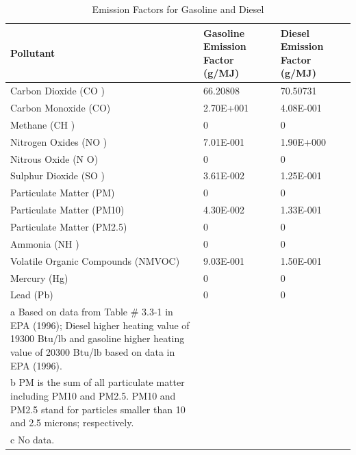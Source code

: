 \begin{longtable}[c]{p{3.0in}p{1.5in}p{1.5in}}
\caption{  Emission Factors for Gasoline and Diesel \protect \label{table:emission-factors-for-gasoline-and-diesel}}\\
\toprule 
Pollutant & Gasoline Emission Factor   (g/MJ) & Diesel Emission Factor   (g/MJ) \tabularnewline \midrule
\endhead
Carbon Dioxide (CO  ) & 66.20808 & 70.50731 \tabularnewline
Carbon Monoxide (CO) & 2.70E+001 & 4.08E-001 \tabularnewline
Methane (CH  ) & 0 & 0 \tabularnewline
Nitrogen Oxides (NO  ) & 7.01E-001 & 1.90E+000 \tabularnewline
Nitrous Oxide (N  O) & 0 & 0 \tabularnewline
Sulphur Dioxide (SO  ) & 3.61E-002 & 1.25E-001 \tabularnewline
Particulate Matter (PM) & 0 & 0 \tabularnewline
Particulate Matter (PM10) & 4.30E-002 & 1.33E-001 \tabularnewline
Particulate Matter (PM2.5) & 0 & 0 \tabularnewline
Ammonia (NH  ) & 0 & 0 \tabularnewline
Volatile Organic Compounds (NMVOC) & 9.03E-001 & 1.50E-001 \tabularnewline
Mercury (Hg) & 0 & 0 \tabularnewline
Lead (Pb) & 0 & 0 \tabularnewline
a Based on data from Table \# 3.3-1 in EPA (1996); Diesel higher heating value of 19300 Btu/lb and gasoline higher heating value of 20300 Btu/lb based on data in EPA (1996). \tabularnewline
b PM is the sum of all particulate matter including PM10 and PM2.5. PM10 and PM2.5 stand for particles smaller than 10 and 2.5 microns; respectively. \tabularnewline
c No data. \tabularnewline
\bottomrule
\end{longtable}

